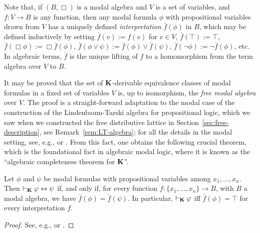 Note that, if $(B,\Box)$ is a modal algebra and $V$ is a set of variables, and $f \colon V \to B$ is any function, then any modal formula $\phi$ with propositional variables drawn from $V$ has a uniquely defined \emph{interpretation} $\bar{f}(\phi)$ in $B$, which may be defined inductively by setting $\bar{f}(v) := f(v)$ for $v \in V$, $\bar{f}(\top) := \top$, $\bar{f}(\Box \phi) := \Box \bar{f}(\phi)$, $\bar{f}(\phi \vee \psi) := \bar{f}(\phi) \vee \bar{f}(\psi)$, $\bar{f}(\neg \phi) := \neg \bar{f}(\phi)$, etc. In algebraic terms, $\bar{f}$ is the unique lifting of $f$ to a homomorphism from the term algebra over $V$ to $B$. 

It may be proved that the set of $\mathbf{K}$-derivable equivalence classes of modal formulas in a fixed set of variables $V$ is, up to isomorphism, the \emph{free modal algebra} over $V$. The proof is a straight-forward adaptation to the modal case of the construction of the Lindenbaum-Tarski algebra for propositional logic, which we saw when we constructed the free distributive lattice in Section~\ref{sec:free-description}, see Remark~\ref{rem:LT-algebra}; for all the details in the modal setting, see, e.g., \cite[Sec.~7.5]{ChaZak1997} or \cite[Sec.~5.2]{BRV2001}. From this fact, one obtains the following crucial theorem, which is the foundational fact in algebraic modal logic, where it is known as the ``algebraic completeness theorem for $\mathbf{K}$''.

\begin{theorem}\label{thm:K-algebraic-completeness}
Let $\phi$ and $\psi$ be modal formulas with propositional variables among $x_1, \dots, x_n$. Then $\vdash_{\mathbf{K}} \varphi \leftrightarrow \psi$ if, and only if, for every function $f \colon \{x_1,\dots,x_n\} \to B$, with $B$ a modal algebra, we have $\bar{f}(\phi) = \bar{f}(\psi)$. In particular, $\vdash_{\mathbf{K}} \varphi$ iff $\bar{f}(\phi) = \top$ for every interpretation $f$.
\end{theorem}
\begin{proof}
See, e.g., \cite[Thms.~7.43 and 7.44]{ChaZak1997} or \cite[Thm.~5.27]{BRV2001}.
\end{proof}

